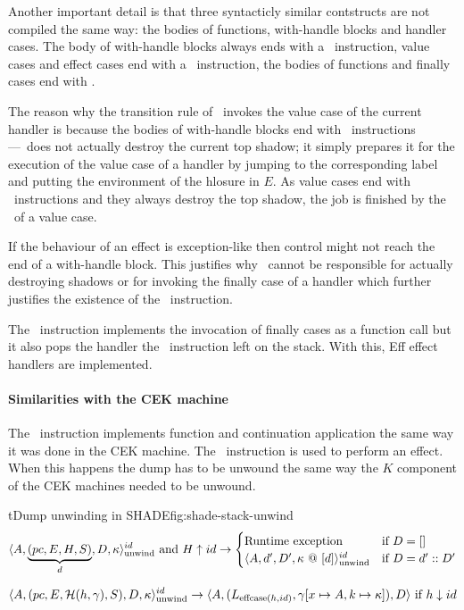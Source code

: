 \documentclass[class=article, crop=false]{standalone}
\begin{document}
Another important detail is that three syntacticly similar contstructs are not
compiled the same way: the bodies of functions, with-handle blocks and handler
cases.
The body of with-handle blocks
always ends with a \vmKillShadow\  instruction, value cases and effect cases end
with a \vmRett\ instruction, the bodies of functions and finally cases end with
\vmRet.

The reason why the transition rule of \vmKillShadow\ invokes the value case of
the current handler is because the bodies of with-handle blocks end with
\vmKillShadow\ instructions---\vmKillShadow\ does not actually destroy the
current top shadow; it simply prepares it for the execution of the value case
of a handler by jumping to the corresponding label and putting the environment
of the hlosure in $E$. As value cases end with \vmRett\ instructions and they
always destroy the top shadow, the job is finished by the \vmRett\ of a value
case.

If the behaviour of an effect is exception-like then control might not reach
the end of a with-handle block. This justifies why \vmKillShadow\ cannot be
responsible for actually destroying shadows or for invoking the finally case of
a handler which further justifies the existence of the \vmFin\ instruction.

The \vmFin\ instruction implements the invocation of finally cases as a
function call but it also pops the handler the \vmCastShadow\ instruction left
on the stack. With this, Eff effect handlers are implemented.

\paragraph{Similarities with the CEK machine}
The \vmApply\ instruction implements function and continuation application the
same way it was done in the CEK machine. The \vmThrow\ instruction is used to
perform an effect. When this happens the dump has to be unwound the same way
the $K$ component of the CEK machines needed to be unwound.

\begin{myfigure}[1]{t}{Dump unwinding in SHADE}{fig:shade-stack-unwind}
    $$ \langle A, \underbrace{(pc, E, H, S)}_d, D, \kappa  \rangle_\text{unwind}^{id} \text{ and } H \uparrow id \to \begin{cases}
        \text{Runtime exception} & \text{if } D = [] \\
    \langle A, d', D', \kappa\ @\ [d] \rangle_\text{unwind}^{id} & \text{if } D = d' :: D' \end{cases} $$

    $$ \langle A, (pc, E, \mathcal{H}(h, \gamma), S), D, \kappa \rangle_\text{unwind}^{id} \to
        \langle A, (L_{\text{effcase}(h, id)}, \gamma[x \mapsto A, k \mapsto \kappa] ), D \rangle \text{ if } h \downarrow id $$
\end{myfigure}
\end{document}
